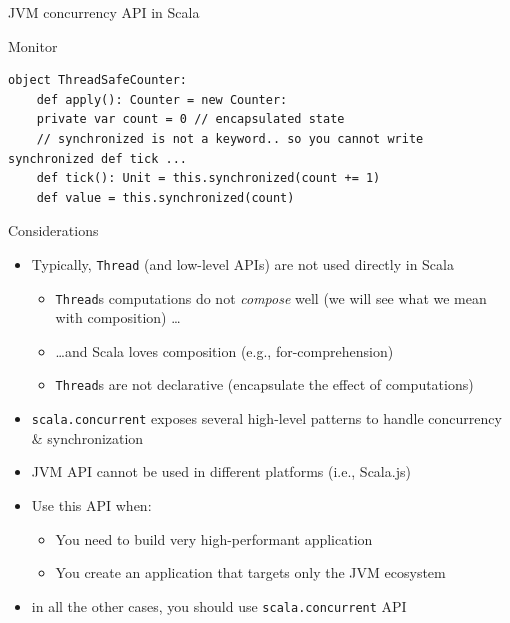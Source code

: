 \documentclass[presentation, 9pt]{beamer}\mode<presentation>{\usetheme{AMSBolognaFC}}
\begin{document}
\begin{frame}{JVM concurrency API in Scala}
\begin{itemize}
\begin{alertblock}{Monitor}
\begin{itemize}
\begin{tcolorbox}[left=0pt, top=0pt, bottom=0pt]
\begin{verbatim}
object ThreadSafeCounter:
	def apply(): Counter = new Counter:
    private var count = 0 // encapsulated state
    // synchronized is not a keyword.. so you cannot write synchronized def tick ...
    def tick(): Unit = this.synchronized(count += 1)
    def value = this.synchronized(count)
					\end{verbatim}
				\end{tcolorbox}
			\end{itemize}
		\end{alertblock}
	\end{itemize}
\end{frame}
\begin{frame}{Considerations}
	\begin{itemize}
		\item Typically, \texttt{Thread} (and low-level APIs) are not used directly in Scala
  	\begin{itemize}
			\item \texttt{Thread}s computations do not \emph{compose} well (we will see what we mean with composition) \dots
   		\item \dots and Scala loves composition (e.g., for-comprehension)
     \item \texttt{Thread}s are not declarative (encapsulate the effect of computations)
		\end{itemize}
 		\item \texttt{scala.concurrent} exposes several high-level patterns to handle concurrency \& synchronization
 		\item JVM API cannot be used in different platforms (i.e., Scala.js)
   	\item Use this API when:
    \begin{itemize}
			\item You need to build very high-performant application
   		\item You create an application that targets only the JVM ecosystem 
		\end{itemize}
		\item in all the other cases, you should use \texttt{scala.concurrent} API
  \end{itemize}
\end{frame}
\end{document}
